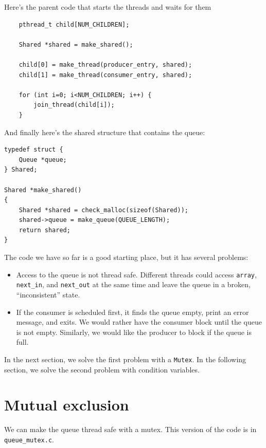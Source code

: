 \documentclass[12pt]{book}
\begin{document}
{Here's the parent code that starts the threads and waits for them

\begin{verbatim}
    pthread_t child[NUM_CHILDREN];

    Shared *shared = make_shared();

    child[0] = make_thread(producer_entry, shared);
    child[1] = make_thread(consumer_entry, shared);

    for (int i=0; i<NUM_CHILDREN; i++) {
        join_thread(child[i]);
    }
\end{verbatim}

And finally here's the shared structure that contains the queue:

\begin{verbatim}
typedef struct {
    Queue *queue;
} Shared;

Shared *make_shared()
{
    Shared *shared = check_malloc(sizeof(Shared));
    shared->queue = make_queue(QUEUE_LENGTH);
    return shared;
}
\end{verbatim}

The code we have so far is a good starting place, but it has
several problems:

\begin{itemize}

\item Access to the queue is not thread safe.  Different threads
could access {\tt array}, \verb"next_in", and \verb"next_out"
at the same time and leave the queue in a broken, ``inconsistent''
state.

\item If the consumer is scheduled first, it finds the queue empty,
print an error message, and exits.  We would rather have the consumer
block until the queue is not empty.  Similarly, we would like the
producer to block if the queue is full.

\end{itemize}

In the next section, we solve the first problem with a {\tt Mutex}.
In the following section, we solve the second problem with condition
variables.


\section{Mutual exclusion}

We can make the queue thread safe with a mutex.  This version
of the code is in \verb"queue_mutex.c".

}
\end{document}

